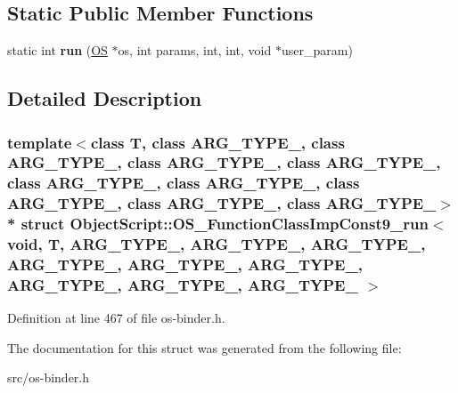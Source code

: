 \subsection*{Static Public Member Functions}
\begin{DoxyCompactItemize}
\item 
static int {\bfseries run} (\hyperlink{class_object_script_1_1_o_s}{OS} $\ast$os, int params, int, int, void $\ast$user\+\_\+param)\hypertarget{struct_object_script_1_1_o_s___function_class_imp_const9__run_3_01void_00_01_t_00_01_01_01_a_r_g01ce8a4af9e96d329bba5865a362071f_a030969a5d728bed762cce6ffaa807576}{}\label{struct_object_script_1_1_o_s___function_class_imp_const9__run_3_01void_00_01_t_00_01_01_01_a_r_g01ce8a4af9e96d329bba5865a362071f_a030969a5d728bed762cce6ffaa807576}

\end{DoxyCompactItemize}


\subsection{Detailed Description}
\subsubsection*{template$<$class T, class A\+R\+G\+\_\+\+T\+Y\+P\+E\+\_, class A\+R\+G\+\_\+\+T\+Y\+P\+E\+\_, class A\+R\+G\+\_\+\+T\+Y\+P\+E\+\_, class A\+R\+G\+\_\+\+T\+Y\+P\+E\+\_, class A\+R\+G\+\_\+\+T\+Y\+P\+E\+\_, class A\+R\+G\+\_\+\+T\+Y\+P\+E\+\_, class A\+R\+G\+\_\+\+T\+Y\+P\+E\+\_, class A\+R\+G\+\_\+\+T\+Y\+P\+E\+\_, class A\+R\+G\+\_\+\+T\+Y\+P\+E\+\_$>$\\*
struct Object\+Script\+::\+O\+S\+\_\+\+Function\+Class\+Imp\+Const9\+\_\+run$<$ void, T,   A\+R\+G\+\_\+\+T\+Y\+P\+E\+\_, A\+R\+G\+\_\+\+T\+Y\+P\+E\+\_, A\+R\+G\+\_\+\+T\+Y\+P\+E\+\_, A\+R\+G\+\_\+\+T\+Y\+P\+E\+\_, A\+R\+G\+\_\+\+T\+Y\+P\+E\+\_, A\+R\+G\+\_\+\+T\+Y\+P\+E\+\_, A\+R\+G\+\_\+\+T\+Y\+P\+E\+\_, A\+R\+G\+\_\+\+T\+Y\+P\+E\+\_, A\+R\+G\+\_\+\+T\+Y\+P\+E\+\_ $>$}



Definition at line 467 of file os-\/binder.\+h.



The documentation for this struct was generated from the following file\+:\begin{DoxyCompactItemize}
\item 
src/os-\/binder.\+h\end{DoxyCompactItemize}
